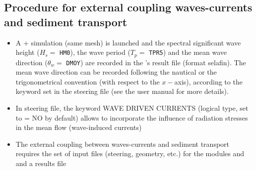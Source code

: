 \subsection{Procedure for external coupling waves-currents and sediment transport}
\begin{itemize}
\item A  $+$ \tomawac{} simulation (same mesh) is launched and the spectral significant wave height ($H_s =$ \texttt{HM0}), the wave period ($T_p =$ \texttt{TPR5}) and the mean wave direction ($\theta_w =$ \texttt{DMOY}) are recorded in the \tomawac{}'s result file (format selafin). The mean wave direction can be recorded following the nautical or the trigonometrical convention (with respect to the $x-$axis), according to the keyword  set in the \tomawac{} steering file (see the \tomawac{} user manual for more details).

\item In  steering file, the keyword {\ttfamily WAVE DRIVEN CURRENTS} (logical type, set to {\ttfamily = NO} by default) allows to incorporate the influence of radiation stresses in the mean flow (wave-induced currents)

\item The external coupling between waves-currents and sediment transport requires the set of input files (steering, geometry, etc.) for the modules  and \gaia{} and a results file \tomawac{}



\end{itemize}

